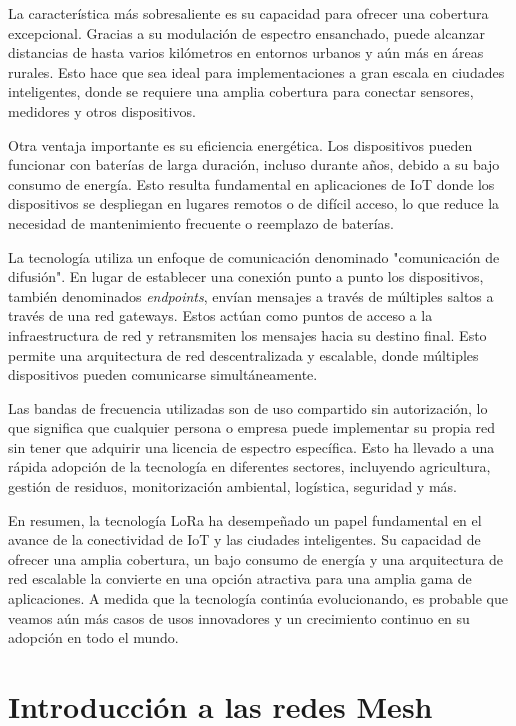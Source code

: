 La característica más sobresaliente es su capacidad para ofrecer una cobertura excepcional. Gracias a su modulación de espectro ensanchado, puede alcanzar distancias de hasta varios kilómetros en entornos urbanos y aún más en áreas rurales. Esto hace que sea ideal para implementaciones a gran escala en ciudades inteligentes, donde se requiere una amplia cobertura para conectar sensores, medidores y otros dispositivos.

Otra ventaja importante es su eficiencia energética. Los dispositivos pueden funcionar con baterías de larga duración, incluso durante años, debido a su bajo consumo de energía. Esto resulta fundamental en aplicaciones de IoT donde los dispositivos se despliegan en lugares remotos o de difícil acceso, lo que reduce la necesidad de mantenimiento frecuente o reemplazo de baterías.

La tecnología utiliza un enfoque de comunicación denominado "comunicación de difusión". En lugar de establecer una conexión punto a punto los dispositivos, también denominados \emph{endpoints}, envían mensajes a través de múltiples saltos a través de una red gateways. Estos actúan como puntos de acceso a la infraestructura de red y retransmiten los mensajes hacia su destino final. Esto permite una arquitectura de red descentralizada y escalable, donde múltiples dispositivos pueden comunicarse simultáneamente.


Las bandas de frecuencia utilizadas son de uso compartido sin autorización, lo que significa que cualquier persona o empresa puede implementar su propia red sin tener que adquirir una licencia de espectro específica. Esto ha llevado a una rápida adopción de la tecnología en diferentes sectores, incluyendo agricultura, gestión de residuos, monitorización ambiental, logística, seguridad y más.

En resumen, la tecnología LoRa ha desempeñado un papel fundamental en el avance de la conectividad de IoT y las ciudades inteligentes. Su capacidad de ofrecer una amplia cobertura, un bajo consumo de energía y una arquitectura de red escalable la convierte en una opción atractiva para una amplia gama de aplicaciones. A medida que la tecnología continúa evolucionando, es probable que veamos aún más casos de usos innovadores y un crecimiento continuo en su adopción en todo el mundo.\citep{WEBSITE:8}


\section{Introducción a las redes Mesh}

